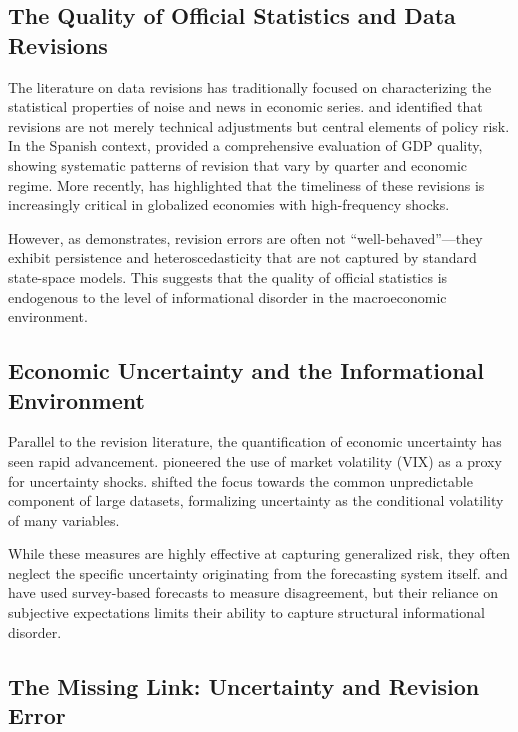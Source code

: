 \documentclass[12pt,a4paper]{article}
\theoremstyle{remark}
\begin{document}
\subsection{The Quality of Official Statistics and Data Revisions}

The literature on data revisions has traditionally focused on characterizing the statistical properties of noise and news in economic series. \citet{mankiw1986} and \citet{orphanides2001} identified that revisions are not merely technical adjustments but central elements of policy risk. In the Spanish context, \citet{pavia2018} provided a comprehensive evaluation of GDP quality, showing systematic patterns of revision that vary by quarter and economic regime. More recently, \citet{asimakopoulos2023} has highlighted that the timeliness of these revisions is increasingly critical in globalized economies with high-frequency shocks. 

However, as \citet{aruoba2008} demonstrates, revision errors are often not ``well-behaved''—they exhibit persistence and heteroscedasticity that are not captured by standard state-space models. This suggests that the quality of official statistics is endogenous to the level of informational disorder in the macroeconomic environment.

\subsection{Economic Uncertainty and the Informational Environment}

Parallel to the revision literature, the quantification of economic uncertainty has seen rapid advancement. \citet{bloomuncer} pioneered the use of market volatility (VIX) as a proxy for uncertainty shocks. \citet{jurado2015} shifted the focus towards the common unpredictable component of large datasets, formalizing uncertainty as the conditional volatility of many variables. 

While these measures are highly effective at capturing generalized risk, they often neglect the specific uncertainty originating from the forecasting system itself. \cite{clark2017} and \cite{carriero2018} have used survey-based forecasts to measure disagreement, but their reliance on subjective expectations limits their ability to capture structural informational disorder.

\subsection{The Missing Link: Uncertainty and Revision Error}
\end{document}

